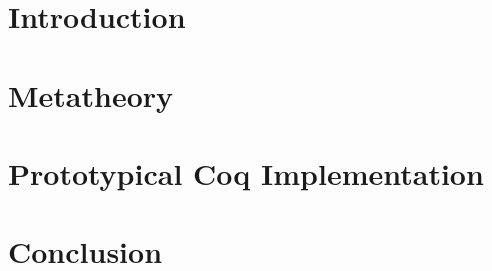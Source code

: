 \begin{abstract}

\end{abstract}

\maketitle

\section{Introduction}
\label{sec:intro}



\section{Metatheory}

\label{sec:metatheory}


\section{Prototypical Coq Implementation}
\label{sec:coqimpl}




\section{Conclusion}
\label{sec:conclusion}

\setlength{\bibsep}{.8ex}


